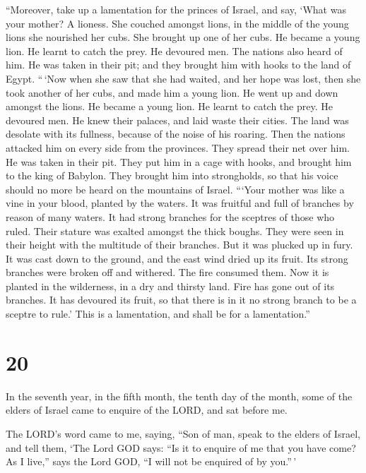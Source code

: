  ``Moreover, take up a lamentation for the princes of
Israel,  and say, `What was your mother? A lioness. She
couched amongst lions, in the middle of the young lions she nourished
her cubs.  She brought up one of her cubs. He became a young
lion. He learnt to catch the prey. He devoured men.  The
nations also heard of him. He was taken in their pit; and they brought
him with hooks to the land of Egypt.  ``\,`Now when she saw
that she had waited, and her hope was lost, then she took another of her
cubs, and made him a young lion.  He went up and down
amongst the lions. He became a young lion. He learnt to catch the prey.
He devoured men.  He knew their palaces, and laid waste
their cities. The land was desolate with its fullness, because of the
noise of his roaring.  Then the nations attacked him on
every side from the provinces. They spread their net over him. He was
taken in their pit.  They put him in a cage with hooks, and
brought him to the king of Babylon. They brought him into strongholds,
so that his voice should no more be heard on the mountains of Israel.
 ```Your mother was like a vine in your blood, planted by
the waters. It was fruitful and full of branches by reason of many
waters.  It had strong branches for the sceptres of those
who ruled. Their stature was exalted amongst the thick boughs. They were
seen in their height with the multitude of their branches. 
But it was plucked up in fury. It was cast down to the ground, and the
east wind dried up its fruit. Its strong branches were broken off and
withered. The fire consumed them.  Now it is planted in the
wilderness, in a dry and thirsty land.  Fire has gone out
of its branches. It has devoured its fruit, so that there is in it no
strong branch to be a sceptre to rule.' This is a lamentation, and shall
be for a lamentation.''

\hypertarget{section-18}{%
\section{20}\label{section-18}}

 In the seventh year, in the fifth month, the tenth day of
the month, some of the elders of Israel came to enquire of the LORD, and
sat before me.

 The LORD's word came to me, saying,  ``Son of
man, speak to the elders of Israel, and tell them, `The Lord GOD says:
``Is it to enquire of me that you have come? As I live,'' says the Lord
GOD, ``I will not be enquired of by you.''\,'

